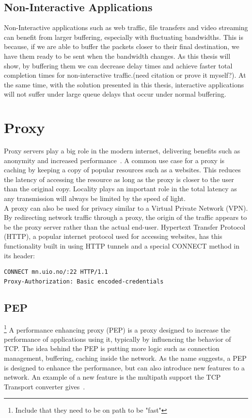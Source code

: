 \documentclass[a4paper,english, 11pt]{report}
\begin{document}
\subsection{Non-Interactive Applications}
Non-Interactive applications such as web traffic, file transfers and video streaming can benefit from larger buffering, especially with fluctuating bandwidths. This is because, if we are able to buffer the packets closer to their final destination, we have them ready to be sent when the bandwidth changes. As this thesis will show, by buffering them we can decrease delay times and achieve faster total completion times for non-interactive traffic.(need citation or prove it myself?). At the same time, with the solution presented in this thesis, interactive applications will not suffer under large queue delays that occur under normal buffering.

\section{Proxy}
Proxy servers play a big role in the modern internet, delivering benefits such as anonymity and increased performance~\cite{nextgen_proxy_servers}. A common use case for a proxy is caching by keeping a copy of popular resources such as a websites. This reduces the latency of accessing the resource as long as the proxy is closer to the user than the original copy. Locality plays an important role in the total latency as any transmission will always be limited by the speed of light.\\

A proxy can also be used for privacy similar to a Virtual Private Network (VPN). By redirecting network traffic through a proxy, the origin of the traffic appears to be the proxy server rather than the actual end-user. Hypertext Transfer Protocol (HTTP), a popular internet protocol used for accessing websites, has this functionality built in using HTTP tunnels and a special CONNECT method in its header:\\

\begin{verbatim}
CONNECT mn.uio.no/:22 HTTP/1.1
Proxy-Authorization: Basic encoded-credentials
\end{verbatim}

\subsection{PEP}\footnote{Include that they need to be on path to be "fast"}
A performance enhancing proxy (PEP) is a proxy designed to increase the performance of applications using it, typically by influencing the behavior of TCP. The idea behind the PEP is putting more logic such as connection management, buffering, caching inside the network. As the name suggests, a PEP is designed to enhance the performance, but can also introduce new features to a network. An example of a new feature is the multipath support the TCP Transport converter gives~\cite{rfc8803}.
\end{document}
